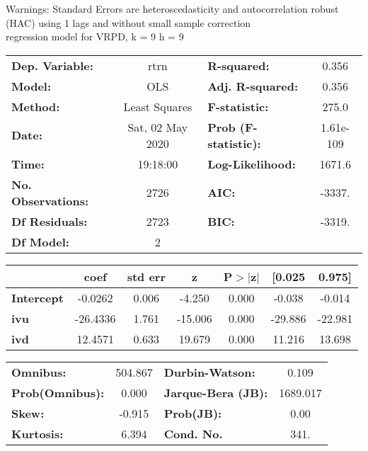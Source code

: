 Warnings: \newline
 [1] Standard Errors are heteroscedasticity and autocorrelation robust (HAC) using 1 lags and without small sample correction\\ 

regression model for VRPD, k = 9 h = 9\begin{center}
\begin{tabular}{lclc}
\toprule
\textbf{Dep. Variable:}    &       rtrn       & \textbf{  R-squared:         } &     0.356   \\
\textbf{Model:}            &       OLS        & \textbf{  Adj. R-squared:    } &     0.356   \\
\textbf{Method:}           &  Least Squares   & \textbf{  F-statistic:       } &     275.0   \\
\textbf{Date:}             & Sat, 02 May 2020 & \textbf{  Prob (F-statistic):} & 1.61e-109   \\
\textbf{Time:}             &     19:18:00     & \textbf{  Log-Likelihood:    } &    1671.6   \\
\textbf{No. Observations:} &        2726      & \textbf{  AIC:               } &    -3337.   \\
\textbf{Df Residuals:}     &        2723      & \textbf{  BIC:               } &    -3319.   \\
\textbf{Df Model:}         &           2      & \textbf{                     } &             \\
\bottomrule
\end{tabular}
\begin{tabular}{lcccccc}
                   & \textbf{coef} & \textbf{std err} & \textbf{z} & \textbf{P$> |$z$|$} & \textbf{[0.025} & \textbf{0.975]}  \\
\midrule
\textbf{Intercept} &      -0.0262  &        0.006     &    -4.250  &         0.000        &       -0.038    &       -0.014     \\
\textbf{ivu}       &     -26.4336  &        1.761     &   -15.006  &         0.000        &      -29.886    &      -22.981     \\
\textbf{ivd}       &      12.4571  &        0.633     &    19.679  &         0.000        &       11.216    &       13.698     \\
\bottomrule
\end{tabular}
\begin{tabular}{lclc}
\textbf{Omnibus:}       & 504.867 & \textbf{  Durbin-Watson:     } &    0.109  \\
\textbf{Prob(Omnibus):} &   0.000 & \textbf{  Jarque-Bera (JB):  } & 1689.017  \\
\textbf{Skew:}          &  -0.915 & \textbf{  Prob(JB):          } &     0.00  \\
\textbf{Kurtosis:}      &   6.394 & \textbf{  Cond. No.          } &     341.  \\
\bottomrule
\end{tabular}
\end{center}

